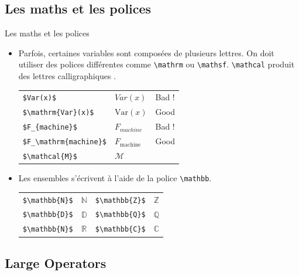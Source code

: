 \subsection{Les maths et les polices}

\begin{frame}[fragile]{Les maths et les polices}
  \begin{itemize}
    \item Parfois, certaines variables sont composées de plusieurs lettres. On doit utiliser des polices différentes comme \lstinline|\mathrm| ou \lstinline|\mathsf|. \lstinline|\mathcal| produit des lettres \og calligraphiques \fg{}.
      \begin{center}
        \begin{tabular}{lll}
                  \lstinline|$Var(x)$| & $Var(x)$ & Bad ! \\
                  \lstinline|$\mathrm{Var}(x)$| & $\mathrm{Var}(x)$ & Good \\
                  \lstinline|$F_{machine}$| & $F_{machine}$ & Bad ! \\
                  \lstinline|$F_\mathrm{machine}$| & $F_\mathrm{machine}$ & Good \\
                  \lstinline|$\mathcal{M}$| & $\mathcal{M}$ &
        \end{tabular}
      \end{center}
    \item Les ensembles s'écrivent à l'aide de la police \lstinline|\mathbb|.
      \begin{center}
          \begin{tabular}{cccc}
          \lstinline|$\mathbb{N}$| & $\mathbb{N}$ & \lstinline|$\mathbb{Z}$| & $\mathbb{Z}$ \\
          \lstinline|$\mathbb{D}$| & $\mathbb{D}$ & \lstinline|$\mathbb{Q}$| & $\mathbb{Q}$ \\
          \lstinline|$\mathbb{N}$| & $\mathbb{R}$ & \lstinline|$\mathbb{C}$| & $\mathbb{C}$
          \end{tabular}
      \end{center}
  \end{itemize}
\end{frame}

\subsection{Large Operators}

